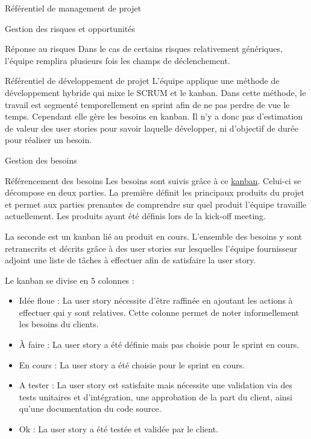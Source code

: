 \documentclass[]{article}
\begin{document}
{\begin{section}{\label{sec:Référentiel de management de projet}Référentiel de management de projet}
\begin{subsection}{\label{sec:Gestion des risques et opportunités}Gestion des risques et opportunités}
\begin{subsubsection}{\label{sec:Réponse au risques}Réponse au risques}
             Dans le cas de certains risques relativement génériques, l'équipe remplira plusieurs fois les champs de déclenchement.
         \end{subsubsection}
     \end{subsection}
    \end{section}

\newpage

    \begin{section}{\label{sec:Référentiel de développement de projet}Référentiel de développement de projet}
     L’équipe applique une méthode de développement hybride qui mixe le SCRUM et le kanban. Dans cette méthode, le travail est segmenté temporellement en sprint afin de ne pas perdre de vue le temps. Cependant elle gère les besoins en kanban. Il n’y a donc pas d’estimation de valeur des user stories pour savoir laquelle développer, ni d’objectif de durée pour réaliser un besoin.
     \begin{subsection}{\label{sec:Gestion des besoins}Gestion des besoins}
         \begin{subsubsection}{\label{sec:Référencement des besoins}Référencement des besoins}
             Les besoins sont suivis grâce à ce \href{https://wekan.flopedt.org/b/HsRkBw5rbmQt5PQet/catalogue}{kanban}. Celui-ci se décompose en deux parties. La première définit les principaux produits du projet et permet aux parties prenantes de comprendre sur quel produit l'équipe travaille actuellement. Les produits ayant été définis lors de la kick-off meeting.

             La seconde est un kanban lié au produit en cours. L'ensemble des besoins y sont retranscrits et décrits grâce à des user stories sur lesquelles l'équipe fournisseur adjoint une liste de tâches à effectuer afin de satisfaire la user story.

             Le kanban se divise en 5 colonnes :
             \begin{itemize}
                 \item Idée floue : La user story nécessite d'être raffinée en ajoutant les actions à effectuer qui y sont relatives. Cette colonne permet de noter informellement les besoins du clients.
                 \item À faire : La user story a été définie mais pas choisie pour le sprint en cours.
                 \item En cours : La user story a été choisie pour le sprint en cours.
                 \item A tester : La user story est satisfaite mais nécessite une validation via des tests unitaires et d’intégration, une approbation de la part du client, ainsi qu’une documentation du code source.
                 \item Ok : La user story a été testée et validée par le client.
             \end{itemize}


\end{subsubsection}
\end{subsection}
\end{section}}
\end{document}
